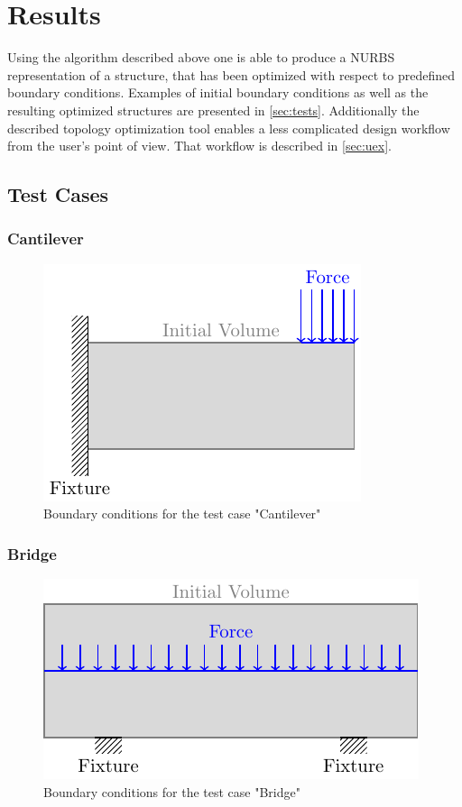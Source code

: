 \chapter{Results}
Using the algorithm described above one is able to produce a NURBS representation of a structure, that has been optimized with respect to predefined boundary conditions. Examples of initial boundary conditions as well as the resulting optimized structures are presented in \autoref{sec:tests}. Additionally the described topology optimization tool enables a less complicated design workflow from the user's point of view. That workflow is described in \autoref{sec:uex}.
\section{Test Cases}
\label{sec:tests}
\subsection{Cantilever}
\begin{figure}[H]
\begin{center}
\includegraphics[scale=1]{Pictures/tikzCantilever/canti.pdf}
\end{center}
\caption{Boundary conditions for the test case "Cantilever"}
\end{figure}

\subsection{Bridge}
\begin{figure}[H]
\begin{center}
\includegraphics[scale=1]{Pictures/tikzBridge/bridge.pdf}
\end{center}
\caption{Boundary conditions for the test case "Bridge"}
\end{figure}

